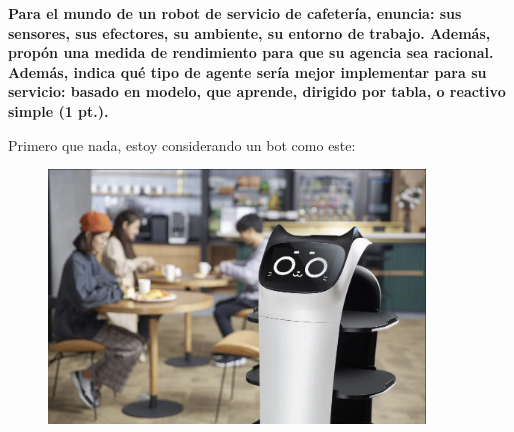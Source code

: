 \textbf{Para el mundo de un robot de servicio de cafetería, enuncia: sus sensores, sus efectores, su ambiente, su entorno de trabajo. Además, propón una medida de rendimiento para que su agencia sea racional. Además, indica qué tipo de agente sería mejor implementar para su servicio: basado en modelo, que aprende, dirigido por tabla, o reactivo simple (1 pt.).} \vspace{.3cm}

Primero que nada, estoy considerando un bot como este:

\begin{figure}[H]
    \centering
    \includegraphics[width=10cm]{src/Img/robot.png}
    \caption{\cite{seboticsImagen}}
\end{figure}

